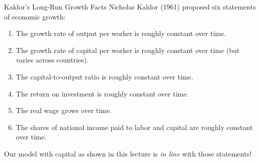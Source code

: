 \documentclass[10pt,c,aspectratio=1610,handout]{beamer}
\begin{document}
\begin{frame}{Kaldor's Long-Run Growth Facts}%
  Nicholas Kaldor (1961) proposed six statements of economic growth:%
  \begin{enumerate}%
    \item The growth rate of output per worker is roughly constant over time.%
    \item The growth rate of capital per worker is roughly constant over time {(\scriptsize but varies across countries)}.%
    \item The capital-to-output ratio is roughly constant over time.%
    \item The return on investment is roughly constant over time.%
    \item The real wage grows over time.%
    \item The shares of national income paid to labor and capital are roughly constant over time.%
  \end{enumerate}%
  \vspace*{0.2in}%
  Our model with capital as shown in this lecture is \emph{in line} with those statements!%
\end{frame}%
\end{document}
